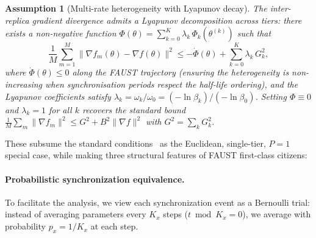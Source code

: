 \documentclass{article}
\newtheorem{assumption}{Assumption}[section]
\begin{document}
\begin{assumption}[Multi-rate heterogeneity with Lyapunov decay]
\label{asm:heterogeneity}
The inter-replica gradient divergence admits a \emph{Lyapunov decomposition}
across tiers: there exists a non-negative function
$\Phi(\theta) = \sum_{k=0}^{K} \lambda_k\,\Phi_k(\theta^{(k)})$ such that
\begin{equation}
\frac{1}{M}\sum_{m=1}^{M}\|\nabla f_m(\theta) - \nabla f(\theta)\|^2
\leq -\dot{\Phi}(\theta)
+ \sum_{k=0}^{K}\lambda_k\,G_k^2,
\end{equation}
where $\dot{\Phi}(\theta) \leq 0$ along the FAUST trajectory (ensuring
the heterogeneity is non-increasing when synchronisation periods respect
the half-life ordering), and the Lyapunov coefficients satisfy
$\lambda_k = \omega_k / \omega_0 = (-\ln\beta_k)/(-\ln\beta_0)$.
Setting $\Phi \equiv 0$ and $\lambda_k = 1$ for all $k$ recovers the
standard bound $\frac{1}{M}\sum_m \|\nabla f_m\|^2 \leq G^2 + B^2
\|\nabla f\|^2$ with $G^2 = \sum_k G_k^2$.
\end{assumption}


These subsume the standard
conditions~\citep{yu2019linearspeedupanalysiscommunication,karimireddy2021scaffoldstochasticcontrolledaveraging,wang2021fieldguidefederatedoptimization,chen2017revisitingdistributedsynchronoussgd}
as the Euclidean, single-tier, $P{=}1$ special case, while making three
structural features of FAUST first-class citizens:



\paragraph{Probabilistic synchronization equivalence.}
To facilitate the analysis, we view each synchronization event as a
Bernoulli trial: instead of averaging parameters every $K_x$ steps
($t \bmod K_x = 0$), we average with probability $p_x = 1/K_x$ at each
step. 
\end{document}
